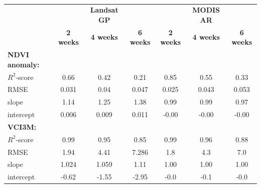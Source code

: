 \documentclass[review]{elsarticle}
\begin{document}
\begin{figure}
	\caption{} \label{fig:gpcontour}
\end{figure}

\begin{table}
	\small
	\caption{} \label{tab:stats}
	\centering
	\begin{tabular}{l|ccc|ccc} 
		\toprule
		& & \textbf{Landsat GP} & & &\textbf{MODIS AR} \\
		& \textbf{2 weeks} & \textbf{4 weeks} & \textbf{6 weeks} & \textbf{2 weeks} & \textbf{4 weeks} & \textbf{6 weeks} \\
		\midrule
		\textbf{NDVI anomaly:}&&&&&\\
		$R^2$-score  &0.66  &0.42  &0.21  &0.85& 0.55& 0.33\\
		RMSE &0.031  &0.04  &0.047  &0.025& 0.043& 0.053\\
		slope &1.14  &1.25 &1.38 &0.99&0.99& 0.97\\
		intercept &0.006 &0.009 &0.011&-0.00& -0.00& -0.00\\
		\midrule
		\textbf{VCI3M:}&&&&&\\
		$R^2$-score  &0.99  &0.95  &0.85  &0.99& 0.96& 0.88\\
		RMSE &1.94  &4.41  &7.286  &1.8& 4.3& 7.0 \\
		slope &1.024  &1.059 &1.11 &1.00&1.00& 1.00\\
		intercept &-0.62  &-1.55 &-2.95&-0.0& -0.1& -0.0\\
		\bottomrule
	\end{tabular}
\end{table}
\end{document}
